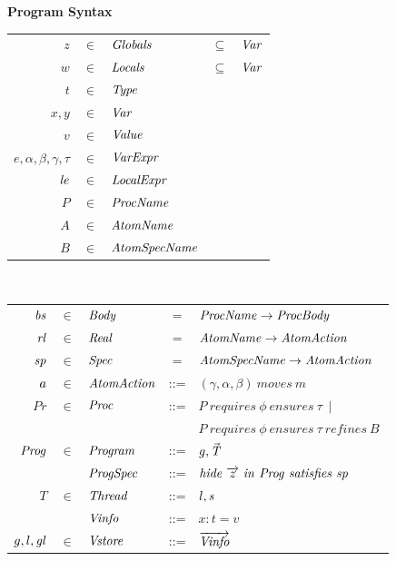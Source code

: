 

\begin{figure}
\setlength{\tabcolsep}{3pt}
{\bf Program Syntax} \\
\begin{tabular}{rclcl}
$z$ & $\in$ & $\mathit{Globals}$ & $\subseteq$ &$\mathit{Var}$ \\
$w$ & $\in$ & $\mathit{Locals}$ & $\subseteq$ & $\mathit{Var}$ \\
$t$ & $\in$ & $\mathit{Type}$ \\
$x,y$ & $\in$ & $\mathit{Var}$ \\
$v$ &  $\in$ & $\mathit{Value}$ \\
$e,\alpha,\beta,\gamma,\tau$ & $\in$ & $\mathit{VarExpr}$ \\
$\mathit{le}$ & $\in$ & $\mathit{LocalExpr}$ \\
$P$ & $\in$ & $\mathit{ProcName}$ \\
$A$ & $\in$ & $\mathit{AtomName}$ \\
$B$ & $\in$ & $\mathit{AtomSpecName}$ \\
\end{tabular}\\
\begin{tabular}{rclcl}
$\mathit{bs}$ & $\in$ & $\mathit{Body}$ & = & $\mathit{ProcName} \rightarrow \mathit{ProcBody}$ \\
$\mathit{rl}$ & $\in$ & $\mathit{Real}$ & = & $\mathit{AtomName} \rightarrow \mathit{AtomAction}$ \\
$\mathit{sp}$ & $\in$ & $\mathit{Spec}$ & = & $\mathit{AtomSpecName} \rightarrow \mathit{AtomAction}$ \\
$\mathit{a}$ & $\in$ & $\mathit{AtomAction}$ & ::= & $(\gamma,\alpha,\beta)\ \mathit{moves}\ m$ \\
$Pr$ & $\in$ & $\mathit{Proc}$ &::= & $P\ \mathit{requires}\ \phi\
\mathit{ensures}\ \tau\ \mid $ \\
& & & & $P\ \mathit{requires}\ \phi\
\mathit{ensures}\ \tau\  \mathit{refines}\ B\ $ \\
$\mathit{Prog}$ & $\in$ & $\mathit{Program}$ & ::= & $g, \vec{\mathit{T}}$ \\
& & $\mathit{ProgSpec}$ & ::= &$\mathit{hide}\
{\overrightarrow{z}}\ \mathit{in}\ \Prog\ \mathit{satisfies}\ \specs$\\  
$T$ & $\in$ & $\mathit{Thread}$ & ::=  & $l, \mathit{s}$ \\
&&$\mathit{Vinfo}$ & ::= & $x:t=v$ \\
$g,l,\mathit{gl}$ & $\in$ & $\mathit{Vstore}$ & ::= & $\overrightarrow{\mathit{Vinfo}}$ \\

\end{tabular}
\end{figure}
